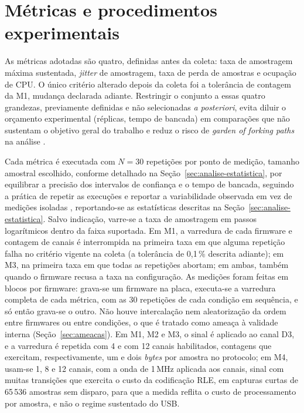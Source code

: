 \section{Métricas e procedimentos experimentais}\label{sec:metricas}

As métricas adotadas são quatro, definidas antes da coleta: taxa de amostragem máxima
sustentada, \emph{jitter} de amostragem, taxa de perda de amostras e ocupação
de \ac{CPU}. O único critério alterado depois da coleta foi a tolerância de
contagem da M1, mudança declarada adiante. Restringir o conjunto a essas quatro grandezas, previamente definidas e
não selecionadas \emph{a posteriori}, evita diluir o orçamento experimental
(réplicas, tempo de bancada) em comparações que não sustentam o objetivo
geral do trabalho e reduz o risco de \emph{garden of forking paths} na análise
\cite{georges2007,mytkowicz2009}.

Cada métrica é executada com $N = 30$ repetições por ponto de medição, tamanho
amostral escolhido, conforme detalhado na Seção~\ref{sec:analise-estatistica},
por equilibrar a precisão dos intervalos de confiança e o tempo de bancada,
seguindo a prática de repetir as execuções e reportar a variabilidade
observada em vez de medições isoladas \cite{georges2007,kalibera2013},
reportando-se as estatísticas descritas
na Seção~\ref{sec:analise-estatistica}. Salvo indicação, varre-se a taxa de amostragem em passos logarítmicos
dentro da faixa suportada. Em M1, a varredura de cada firmware e contagem de
canais é interrompida na primeira taxa em que alguma repetição falha no
critério vigente na coleta (a tolerância de 0,1\,\% descrita adiante); em M3,
na primeira taxa em que todas as repetições abortam; em ambas, também quando
o firmware recusa a taxa na configuração. As medições foram feitas em blocos
por firmware: grava-se um firmware na placa, executa-se a varredura completa
de cada métrica, com as 30 repetições de cada condição em sequência, e só
então grava-se o outro. Não houve intercalação nem aleatorização da ordem
entre firmwares ou entre condições, o que é tratado como ameaça à validade
interna (Seção~\ref{sec:ameacas}). Em M1, M2 e M3, o sinal é aplicado ao canal D3, e a
varredura é repetida com 4 e com 12 canais habilitados, contagens que
exercitam, respectivamente, um e dois \emph{bytes} por amostra no protocolo; em
M4, usam-se 1, 8 e 12 canais, com a onda de 1\,MHz aplicada aos canais, sinal
com muitas transições que exercita o custo da codificação \ac{RLE}, em capturas
curtas de 65\,536 amostras sem disparo, para que a medida reflita o custo de
processamento por amostra, e não o regime sustentado do \ac{USB}.

